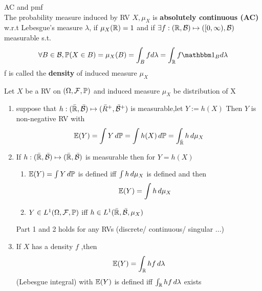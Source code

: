 \newpage 
\begin{dfn}AC and pmf \\
    The probability measure induced by RV $X, \mu_X$ is \textbf{absolutely continuous (AC)} w.r.t Lebesgue's measure $\lambda$, if $\mu_X(\mathbb{R}) = 1$ and if $\exists f:(\mathbb{R}, \mathcal{B}) \mapsto ([0,\infty), \mathcal{B})$ measurable s.t. 
    \begin{equation*}
        \forall B \in \B, \prob(X\in B) = \mu_X(B) = \int_B fd\lambda = \int_\R f \I_B d\lambda
    \end{equation*}f is called the \textbf{density} of induced measure $\mu_X$
\end{dfn}
\begin{thm}
\label{change}
Let $X$ be a RV on $(\Omega, \mathcal{F}, \mathbb{P})$ and induced measure $\mu_X$ be distribution of X
\begin{enumerate}
    \item suppose that $h: (\bar{\mathbb{R}}, \bar{\mathcal{B}})\mapsto (\bar{R}^+, \bar{\mathcal{B}}^+)$ is measurable,let $Y:=h(X)$ Then $Y$ is non-negative RV with
    \begin{equation*}
        \mathbb{E}(Y) = \int Y\mathop{}\!d\mathbb{P} = \int h(X) \mathop{}\!d\mathbb{P}  = \int_{\bar{\mathbb{R}}} h \mathop{}\!d\mu_X
    \end{equation*}
    \item If $h: (\bar{\mathbb{R}}, \bar{\mathcal{B}})\mapsto (\bar{\mathbb{R}}, \bar{\mathcal{B}})$ is measurable then for $Y = h(X)$
        \begin{enumerate}
            \item $\mathbb{E}(Y) = \int Y\mathop{}\!d \mathbb{P}$ is defined iff $\int h \mathop{}\!d\mu_X$ is defined and then
            \begin{equation*}
                \mathbb{E}(Y) = \int h \mathop{}\!d \mu_X
            \end{equation*}
            \item $Y\in L^{1}(\Omega,\mathcal{F}, \mathbb{P})$ iff $h\in L^{1}(\bar{\mathbb{R}}, \bar{\mathcal{B}}, \mu_X)$
        \end{enumerate}
    \begin{rem}
    Part 1 and 2 holds for any RVs (discrete/ continuous/ singular ...)
    \end{rem}
    \item If $X$ has a density $f$ ,then 
    \begin{equation*}
        \mathbb{E}(Y) = \int_{\mathbb{R}} hf \mathop{}\!d\lambda
    \end{equation*}(Lebesgue integral) with $\mathbb{E}(Y)$ is defined iff $\int_{\mathbb{R}} hf \mathop{}\!d\lambda$ exists


\end{enumerate}
\end{thm}
